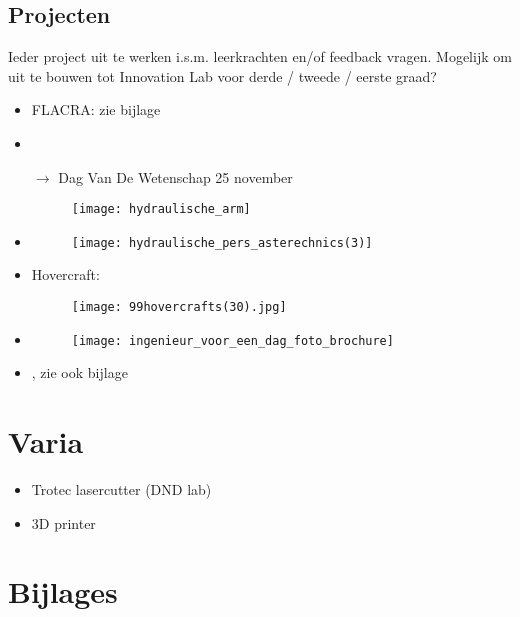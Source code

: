 \subsection{Projecten}
Ieder project uit te werken i.s.m. leerkrachten en/of feedback vragen. Mogelijk om uit te bouwen tot Innovation Lab voor derde / tweede / eerste graad? 
\begin{itemize}	
	\item FLACRA: zie bijlage
	\item {}	
	\item[$\rightarrow$] Dag Van De Wetenschap 25 november 
	\begin{figure}[H]
		\centering
	\texttt{[image: hydraulische\_arm]}	\end{figure}
	\item 	{}
	\begin{figure}[H]
		\centering	\texttt{[image: hydraulische\_pers\_asterechnics(3)]}
	\end{figure}
	\item Hovercraft: 
	
	\begin{figure}[H]
	\centering
	\texttt{[image: 99hovercrafts(30).jpg]}
	\end{figure}
	
	\item {}
	\begin{figure}[H]
		\centering	\texttt{[image: ingenieur\_voor\_een\_dag\_foto\_brochure]}
	\end{figure}	
	\item {}, zie ook bijlage
\end{itemize}

\section{Varia}
\begin{itemize}
	\item Trotec lasercutter (DND lab)
	\item 3D printer
\end{itemize}

\section{Bijlages}





%

